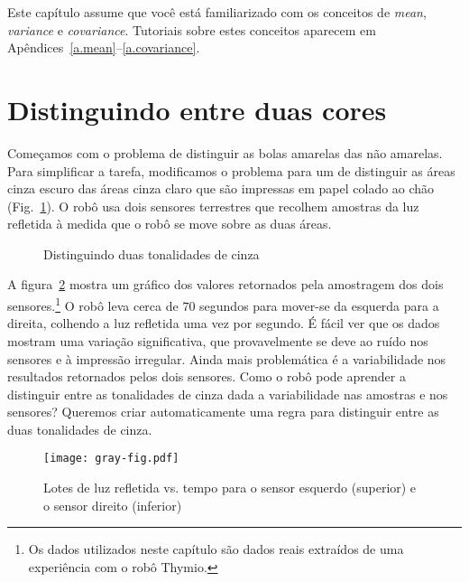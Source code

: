 Este capítulo assume que você está familiarizado com os conceitos de \emph{mean}, \emph{variance} e \emph{covariance}. Tutoriais sobre estes conceitos aparecem em Apêndices~\ref{a.mean}--\ref{a.covariance}.

\section{Distinguindo entre duas cores}\label{s.sorting-onesensor}

Começamos com o problema de distinguir as bolas amarelas das não amarelas. Para simplificar a tarefa, modificamos o problema para um de distinguir as áreas cinza escuro das áreas cinza claro que são impressas em papel colado ao chão (Fig.~\ref{fig.closegrays1}). O robô usa dois sensores terrestres que recolhem amostras da luz refletida à medida que o robô se move sobre as duas áreas.

\begin{figure}
\begin{center}
\end{center}
\caption{Distinguindo duas tonalidades de cinza}\label{fig.closegrays1}
\end{figure}

A figura~\ref{fig.closegrays2} mostra um gráfico dos valores retornados pela amostragem dos dois sensores.\footnote{Os dados utilizados neste capítulo são dados reais extraídos de uma experiência com o robô Thymio.} O robô leva cerca de $70$ segundos para mover-se da esquerda para a direita, colhendo a luz refletida uma vez por segundo. É fácil ver que os dados mostram uma variação significativa, que provavelmente se deve ao ruído nos sensores e à impressão irregular. Ainda mais problemática é a variabilidade nos resultados retornados pelos dois sensores. Como o robô pode aprender a distinguir entre as tonalidades de cinza dada a variabilidade nas amostras e nos sensores? Queremos criar automaticamente uma regra para distinguir entre as duas tonalidades de cinza.

\begin{figure}
\begin{center}
\texttt{[image: gray-fig.pdf]}
\end{center}
\caption{Lotes de luz refletida vs. tempo para o sensor esquerdo (superior) e o sensor direito (inferior)}\label{fig.closegrays2}
\end{figure}

